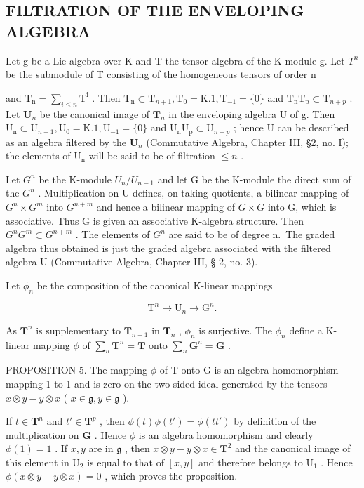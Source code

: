 \subsection{FILTRATION OF THE ENVELOPING ALGEBRA}

Let g be a Lie algebra over K and T the tensor algebra of the K-module g. Let \(T^{n}\) be the submodule of T consisting of the homogeneous tensors of order n

and \(\mathrm{T_n} = \sum_{i\leqslant n}\mathrm{T^i}\) . Then \(\mathrm{T_n}\subset \mathrm{T}_{n + 1},\mathrm{T_0} = \mathrm{K}.1,\mathrm{T}_{-1} = \{0\}\) and \(\mathrm{T_nT_p}\subset \mathrm{T}_{n + p}\) . Let \(\mathbf{U}_n\) be the canonical image of \(\mathbf{T}_n\) in the enveloping algebra U of g. Then \(\mathrm{U_n}\subset \mathrm{U}_{n + 1},\mathrm{U_0} = \mathrm{K}.1,\mathrm{U}_{-1} = \{0\}\) and \(\mathrm{U_nU_p}\subset \mathrm{U}_{n + p}\) ; hence U can be described as an algebra filtered by the \(\mathbf{U}_n\) (Commutative Algebra, Chapter III, §2, no. I); the elements of \(\mathrm{U_n}\) will be said to be of filtration \(\leqslant n\) .

Let \(G^n\) be the K-module \(U_n / U_{n-1}\) and let G be the K-module the direct sum of the \(G^n\) . Multiplication on U defines, on taking quotients, a bilinear mapping of \(G^n \times G^m\) into \(G^{n+m}\) and hence a bilinear mapping of \(G \times G\) into G, which is associative. Thus G is given an associative K-algebra structure. Then \(G^n G^m \subset G^{n+m}\) . The elements of \(G^n\) are said to be of degree n.~The graded algebra thus obtained is just the graded algebra associated with the filtered algebra U (Commutative Algebra, Chapter III, § 2, no. 3).

Let \(\phi_{n}\) be the composition of the canonical K-linear mappings

\[
\mathrm{T} ^ {n} \rightarrow \mathrm{U} _ {n} \rightarrow \mathrm{G} ^ {n}.
\]

As \(\mathbf{T}^n\) is supplementary to \(\mathbf{T}_{n - 1}\) in \(\mathbf{T}_n\) , \(\phi_n\) is surjective. The \(\phi_n\) define a K-linear mapping \(\phi\) of \(\sum_{n}\mathbf{T}^{n} = \mathbf{T}\) onto \(\sum_{n}\mathbf{G}^{n} = \mathbf{G}\) .

PROPOSITION 5. The mapping \(\phi\) of T onto G is an algebra homomorphism mapping 1 to 1 and is zero on the two-sided ideal generated by the tensors \(x \otimes y - y \otimes x\) ( \(x \in \mathfrak{g}, y \in \mathfrak{g}\) ).

If \(t \in \mathbf{T}^n\) and \(t' \in \mathbf{T}^p\) , then \(\phi(t)\phi(t') = \phi(tt')\) by definition of the multiplication on \(\mathbf{G}\) . Hence \(\phi\) is an algebra homomorphism and clearly \(\phi(1) = 1\) . If \(x, y\) are in \(\mathfrak{g}\) , then \(x \otimes y - y \otimes x \in \mathbf{T}^2\) and the canonical image of this element in \(\mathrm{U}_2\) is equal to that of \([x, y]\) and therefore belongs to \(\mathrm{U}_1\) . Hence \(\phi(x \otimes y - y \otimes x) = 0\) , which proves the proposition.


